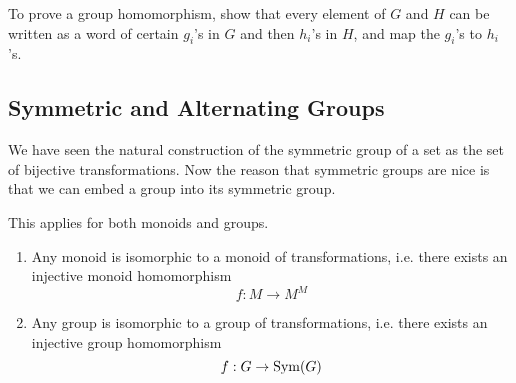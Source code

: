   \begin{theorem}[Tip]
    To prove a group homomorphism, show that every element of $G$ and $H$ can be written as a word of certain $g_i$'s in $G$ and then $h_i$'s in $H$, and map the $g_i$'s to $h_i$'s. 
  \end{theorem}

\subsection{Symmetric and Alternating Groups}

  We have seen the natural construction of the symmetric group of a set as the set of bijective transformations. Now the reason that symmetric groups are nice is that we can embed a group into its symmetric group. 

  \begin{theorem}
    This applies for both monoids and groups. 
    \begin{enumerate}
      \item Any monoid is isomorphic to a monoid of transformations, i.e. there exists an injective monoid homomorphism 
        \begin{equation}
          f: M \to M^M
        \end{equation}
      \item Any group is isomorphic to a group of transformations, i.e. there exists an injective group homomorphism
        \begin{equation}
          f: G \to \operatorname{Sym}(G)
        \end{equation}
    \end{enumerate}
  \end{theorem}
